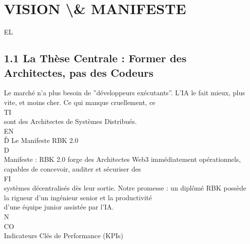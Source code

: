 \documentclass[12pt,landscape,a4paper]{article}
\begin{document}
\section{VISION \textbackslash{}& MANIFESTE}
\vspace{0.5em}
\vspace{0.5em}
\vspace{0.5em}
\vspace{0.5em}
EL\\
\subsection{1.1 La Thèse Centrale : Former des Architectes, pas des Codeurs}
Le marché n’a plus besoin de ”développeurs exécutants”. L’IA le fait mieux, plus vite, et moins cher. Ce qui manque cruellement, ce\\
\vspace{0.5em}
\vspace{0.5em}
\vspace{0.5em}
\vspace{0.5em}
TI\\
sont des Architectes de Systèmes Distribués.\\
\vspace{0.5em}
\vspace{0.5em}
\vspace{0.5em}
\vspace{0.5em}
EN\\
Ď Le Manifeste RBK 2.0\\
\vspace{0.5em}
\vspace{0.5em}
\vspace{0.5em}
D\\
Manifeste : RBK 2.0 forge des Architectes Web3 immédiatement opérationnels, capables de concevoir, auditer et sécuriser des\\
\vspace{0.5em}
\vspace{0.5em}
\vspace{0.5em}
\vspace{0.5em}
FI\\
systèmes décentralisés dès leur sortie. Notre promesse : un diplômé RBK possède la rigueur d’un ingénieur senior et la productivité\\
d’une équipe junior assistée par l’IA.\\
N\\
CO\\
Indicateurs Clés de Performance (KPIs)\\
\end{document}
